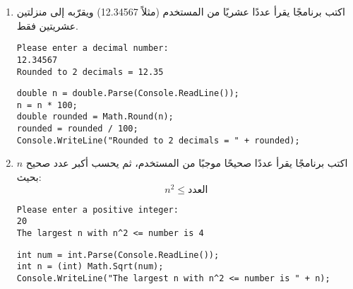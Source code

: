 \documentclass[12pt]{article}
\begin{document}
\begin{enumerate}[itemsep=3em]
    \item
    اكتب برنامجًا يقرأ عددًا عشريًا من المستخدم (مثلاً 12.34567) ويقرّبه إلى منزلتين عشريتين فقط.
    \ifdetailed
    \begin{example}
    \begin{english}
    \begin{lstlisting}
Please enter a decimal number:
12.34567
Rounded to 2 decimals = 12.35
    \end{lstlisting}
    \end{english}
    \end{example}
    \ifwithsols
    \begin{solution}
    \begin{english}
    \begin{lstlisting}
double n = double.Parse(Console.ReadLine());
n = n * 100;
double rounded = Math.Round(n);
rounded = rounded / 100;
Console.WriteLine("Rounded to 2 decimals = " + rounded);
    \end{lstlisting}
    \end{english}
    \end{solution}
    \fi
    \clearpage
    \fi

    \item
    اكتب برنامجًا يقرأ عددًا صحيحًا موجبًا من المستخدم، ثم يحسب أكبر عدد صحيح $n$ بحيث:
    $$ n^2 \leq \text{العدد} $$
    \ifdetailed
    \begin{example}
    \begin{english}
    \begin{lstlisting}
Please enter a positive integer:
20
The largest n with n^2 <= number is 4
    \end{lstlisting}
    \end{english}
    \end{example}
    \ifwithsols
    \begin{solution}
    \begin{english}
    \begin{lstlisting}
int num = int.Parse(Console.ReadLine());
int n = (int) Math.Sqrt(num);
Console.WriteLine("The largest n with n^2 <= number is " + n);
    \end{lstlisting}
    \end{english}
    \end{solution}
    \fi
\fi
\end{enumerate}
\end{document}

